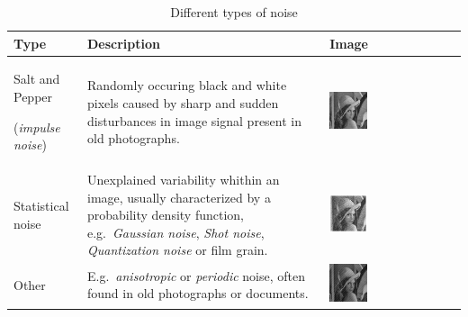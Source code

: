 \begin{table}[t]
{\small
\begin{tabular}{p{8em}p{12em}l}
\toprule
\textbf{Type} & \textbf{Description} & \textbf{Image} \\
\midrule
Salt and Pepper \par (\emph{impulse noise})
&
Randomly occuring black and white pixels caused by sharp and sudden
disturbances in image signal present in old photographs.
&
\includegraphics[width=0.3\textwidth, align=t]{img/preprocessing/noise_saltpepper.png} \\
Statistical noise 
&
Unexplained variability whithin an image, usually characterized by a probability density function, e.g.~\emph{Gaussian noise}, \emph{Shot noise}, \emph{Quantization noise} or film grain.
&
\includegraphics[width=0.3\textwidth, align=t]{img/preprocessing/noise_gaussian.jpg}\\
Other
&
E.g.~\emph{anisotropic} or \emph{periodic} noise, often found in old photographs or documents.
&
\includegraphics[width=0.3\textwidth, align=t]{img/preprocessing/noise_periodic.jpg} \\
\bottomrule
\end{tabular}
}
\caption{Different types of noise}
\label{tab:preprocessNoiseTypes}
\end{table}

